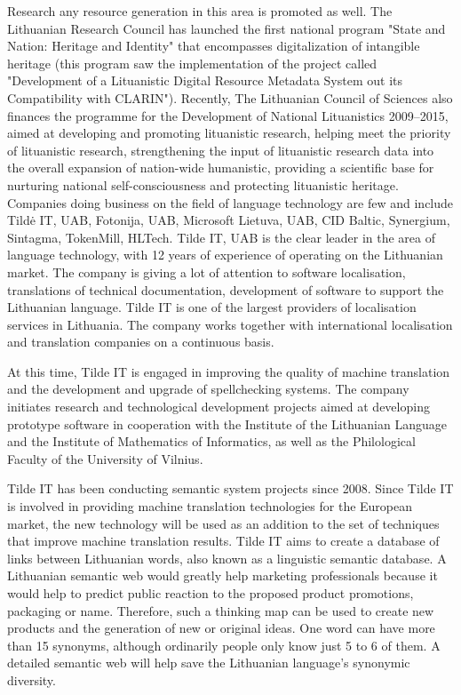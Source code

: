 \begin{multicols}{2}
Research any resource generation in this area is promoted as well. The Lithuanian Research Council has launched the first national program "State and Nation: Heritage and Identity" that encompasses digitalization of intangible heritage (this program saw the implementation of the project called "Development of a Lituanistic Digital Resource Metadata System out its Compatibility with CLARIN"). Recently, The Lithuanian Council of Sciences also finances the programme for the Development of National Lituanistics 2009–2015, aimed at developing and promoting lituanistic research, helping meet the priority of lituanistic research, strengthening the input of lituanistic research data into the overall expansion of nation-wide humanistic, providing a scientific base for nurturing national self-consciousness and protecting lituanistic heritage.
Companies doing business on the field of language technology are few and include Tildė IT, UAB, Fotonija, UAB, Microsoft Lietuva, UAB, CID Baltic, Synergium, Sintagma, TokenMill, HLTech.
Tilde IT, UAB is the clear leader in the area of language technology, with 12 years of experience of operating on the Lithuanian market.
The company is giving a lot of attention to software localisation, translations of technical documentation, development of software to support the Lithuanian language. Tilde IT is one of the largest providers of localisation services in Lithuania. The company works together with international localisation and translation companies on a continuous basis.

    At this time, Tilde IT is engaged in improving the quality of machine translation and the development and upgrade of spellchecking systems. The company initiates research and technological development projects aimed at developing prototype software in cooperation with the Institute of the Lithuanian Language and the Institute of Mathematics of Informatics, as well as the Philological Faculty of the University of Vilnius.

    Tilde IT has been conducting semantic system projects since 2008. Since Tilde IT is involved in providing machine translation technologies for the European market, the new technology will be used as an addition to the set of techniques that improve machine translation results. Tilde IT aims to create a database of links between Lithuanian words, also known as a linguistic semantic database. A Lithuanian semantic web would greatly help marketing professionals because it would help to predict public reaction to the proposed product promotions, packaging or name. Therefore, such a thinking map can be used to create new products and the generation of new or original ideas. One word can have more than 15 synonyms, although ordinarily people only know just 5 to 6 of them. A detailed semantic web will help save the Lithuanian language’s synonymic diversity. 


\end{multicols}
